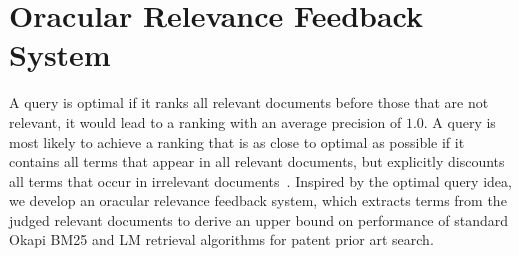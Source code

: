 \section{Oracular Relevance Feedback System}
\label{sec:oraculrquery}
A query is optimal if it ranks all relevant documents before
those that are not relevant, it would lead to a ranking with an average precision of $1.0$. A query
is most likely to achieve a ranking that is as close to optimal as possible if it contains all terms that
appear in all relevant documents, but explicitly discounts all terms that occur in irrelevant documents~\citep{manning2008introduction}.
Inspired by the optimal query idea, we develop an oracular relevance feedback system, which
extracts terms from the judged relevant documents to derive an upper bound on performance of
standard Okapi BM25 and LM retrieval
algorithms for patent prior art search.
